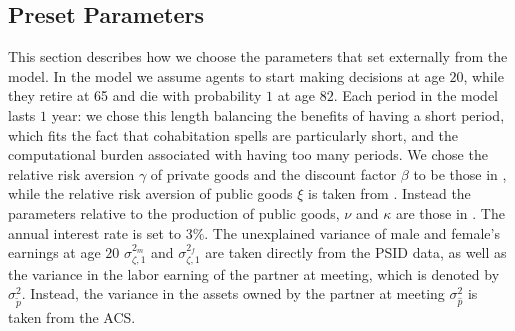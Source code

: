 \documentclass[12pt]{article}
\numberwithin{table}{section}
\begin{document}
\subsection{Preset Parameters}
This section describes how we choose the parameters that set externally from the model. In the model we assume agents to start making decisions at age $20$, while they retire at 65 and die with probability $1$ at age $82$. Each period in the model lasts $1$ year: we chose this length balancing the benefits of having a short period, which fits the fact that cohabitation spells are particularly short, and the computational burden associated with having too many periods. We chose the relative risk aversion $\gamma$ of private goods and the discount factor $\beta$ to be those in \cite{attanasio2008}, while the relative risk aversion of public goods $\xi$ is taken from \cite{greenwood2016}. Instead the parameters relative to the production of public goods, $\nu$ and $\kappa$ are those in \cite{mcgrattan1997}. The annual interest rate is set to $3\%$. The unexplained variance of male and female's earnings at age $20$ $\sigma_{\zeta,1}^{2_m}$ and $\sigma_{\zeta,1}^{2_f}$ are taken directly from the PSID data, as well as the variance in the labor earning of the partner at meeting, which is denoted by $\sigma^2_{\tilde{p}}$. Instead, the variance in the assets owned by the partner at meeting $\sigma^2_{\hat{p}}$ is taken from the ACS.
\end{document}
